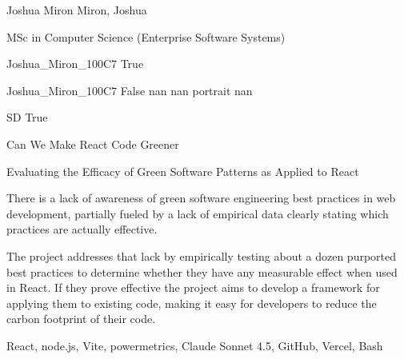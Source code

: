 
\begingroup{}\relax



\def\Key{Joshua_Miron_100C7}

{Joshua Miron}
{Miron, Joshua}

{MSc in Computer Science (Enterprise Software Systems)}

{Joshua_Miron_100C7}
{True}

{Joshua_Miron_100C7}
{False}
{nan}
{nan}
{portrait}
{nan}

{SD}
{True}

{Can We Make React Code Greener}

{Evaluating the Efficacy of Green Software Patterns as Applied to React}

{There is a lack of awareness of green software engineering best practices in web development, partially fueled by a lack of empirical data clearly stating which practices are actually effective.

The project addresses that lack by empirically testing about a dozen purported best practices to determine whether they have any measurable effect when used in React. If they prove effective the project aims to develop a framework for applying them to existing code, making it easy for developers to reduce the carbon footprint of their code.}

{React, node.js, Vite, powermetrics, Claude Sonnet 4.5, GitHub, Vercel, Bash}

